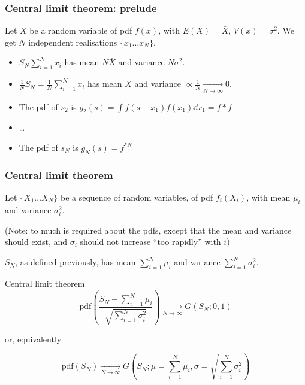\documentclass[9pt]{beamer}
\newif\ifmynote
\newcommand\mynote[1]{%
\ifmynote \textbf{#1} \else \fi
}
\begin{document}
\begin{frame}
 \frametitle{Central limit theorem: prelude}
 
 \mynote{Écrire au tableau}
 
 Let $X$ be a random variable of pdf $f(x)$, with $E(X) = \bar{X}$, $V(x) = \sigma^2$. We get $N$ independent realisations $\{ x_1 \dots x_N \}$.
 
 \begin{itemize}
  \item $S_N\sum_{i=1}^N x_i$ has mean $N \bar{X}$ and variance $N \sigma^2$.
  \item $\frac{1}{N} S_N = \frac{1}{N} \sum_{i=1}^N x_i$ has mean $\bar{X}$ and variance $\propto \frac{1}{N} \xrightarrow[N\to\infty]{}0$.
 \end{itemize}

 \begin{itemize}
  \item The pdf of $s_2$ is $g_2(s) = \int f(s-x_1) f(x_1) \dd x_1 = f * f$
  \item \dots
  \item The pdf of $s_N$ is $g_N(s) = f^{*N}$
 \end{itemize}

\end{frame}

\begin{frame}
 \frametitle{Central limit theorem}
 
 \mynote{Écrire au tableau}
 
 Let $\{ X_1 \dots X_N\}$ be a sequence of random variables, of pdf $f_i(X_i)$, with mean $\mu_i$ and variance $\sigma_i^2$.
 
 \begin{footnotesize}(Note: to much is required about the pdfs, except that the mean and variance should exist, and $\sigma_i$ should not increase ``too rapidly'' with $i$) \end{footnotesize}
 
 $S_N$, as defined previously, has mean $\sum_{i=1}^N \mu_i$ and variance $\sum_{i=1}^N \sigma_i^2$.
 
 \begin{block}{Central limit theorem}
  $$\text{pdf}\left(\frac{S_N - \sum_{i=1}^N \mu_i}{\sqrt{\sum_{i=1}^N \sigma_i^2}}\right) \xrightarrow[N\to\infty]{} G(S_N; 0,1)$$
  
  or, equivalently
  
  $$\text{pdf}(S_N) \xrightarrow[N\to\infty]{} G\left(S_N; \mu = \sum_{i=1}^N \mu_i,\sigma = \sqrt{\sum_{i=1}^N \sigma_i^2}\right)$$
 \end{block}

\end{frame}
\end{document}
